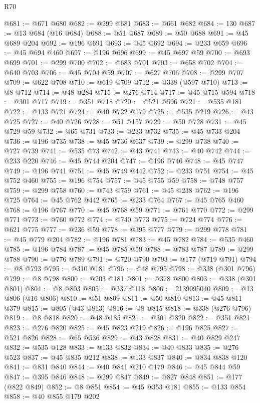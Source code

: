 \begin{lexlean}{R70}
\begin{coremodule}
@681 := @671 @680
@682 := @299 @681
@683 := @661 @682
@684 := 130
@687 := @13 @684 (@16 @684)
@688 := @51 @687
@689 := @50 @688
@691 := @45 @689 @204
@692 := @196 @691
@693 := @45 @692
@694 := @233 @659
@696 := @45 @694 @460
@697 := @196 @696
@699 := @45 @697 @59
@700 := @693 @699
@701 := @299 @700
@702 := @683 @701
@703 := @658 @702
@704 := @640 @703
@706 := @45 @704 @59
@707 := @627 @706
@708 := @299 @707
@709 := @622 @708
@710 := @619 @709
@712 := @338 (@597 @710)
@713 := @8 @712
@714 := @48 @284
@715 := @276 @714
@717 := @45 @715 @594
@718 := @301 @717
@719 := @351 @718
@720 := @521 @596
@721 := @535 @181
@722 := @133 @721
@724 := @40 @722 @179
@725 := @535 @219
@726 := @43 @725
@727 := @40 @726
@728 := @51 @157
@729 := @50 @728
@731 := @45 @729 @59
@732 := @65 @731
@733 := @233 @732
@735 := @45 @733 @204
@736 := @196 @735
@738 := @45 @736 @637
@739 := @299 @738
@740 := @727 @739
@741 := @535 @73
@742 := @43 @741
@743 := @40 @742
@744 := @233 @220
@746 := @45 @744 @204
@747 := @196 @746
@748 := @45 @747
@749 := @196 @741
@751 := @45 @749 @442
@752 := @233 @751
@754 := @45 @752 @460
@755 := @196 @754
@757 := @45 @755 @59
@758 := @748 @757
@759 := @299 @758
@760 := @743 @759
@761 := @45 @238
@762 := @196 @725
@764 := @45 @762 @442
@765 := @233 @764
@767 := @45 @765 @460
@768 := @196 @767
@770 := @45 @768 @59
@771 := @761 @770
@772 := @299 @771
@773 := @760 @772
@774 := @740 @773
@775 := @724 @774
@776 := @621 @775
@777 := @236 @59
@778 := @395 @777
@779 := @299 @778
@781 := @45 @779 @204
@782 := @196 @781
@783 := @45 @782
@784 := @535 @460
@785 := @196 @784
@787 := @45 @785 @59
@788 := @783 @787
@789 := @299 @788
@790 := @776 @789
@791 := @720 @790
@793 := @177 (@719 @791)
@794 := @8 @793
@795 := @310 @181
@796 := @48 @795
@798 := @338 (@301 @796)
@799 := @8 @798
@800 := @203 @181
@801 := @378 @800
@803 := @338 (@301 @801)
@804 := @8 @803
@805 := @337 @118
@806 := 2139095040
@809 := @13 @806 (@16 @806)
@810 := @51 @809
@811 := @50 @810
@813 := @45 @811 @379
@815 := @805 (@43 @813)
@816 := @8 @815
@818 := @338 (@276 @796)
@819 := @8 @818
@820 := @48 @185
@821 := @301 @820
@822 := @351 @821
@823 := @276 @820
@825 := @45 @823 @219
@826 := @196 @825
@827 := @521 @826
@828 := @65 @536
@829 := @43 @828
@831 := @40 @829 @247
@832 := @535 @128
@833 := @133 @832
@834 := @40 @833
@835 := @276 @523
@837 := @45 @835 @212
@838 := @133 @837
@840 := @834 @838 @120
@841 := @831 @840
@844 := @40 @841 @210 @179
@846 := @45 @844 @59
@847 := @395 @846
@848 := @299 @847
@849 := @827 @848
@851 := @177 (@822 @849)
@852 := @8 @851
@854 := @45 @353 @181
@855 := @133 @854
@858 := @40 @855 @179 @202

\end{coremodule}
\end{lexlean}
